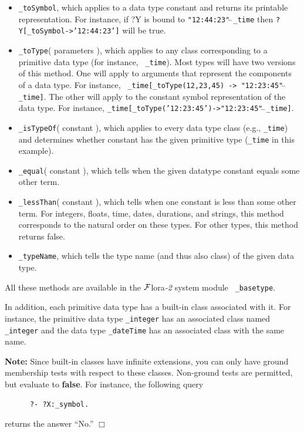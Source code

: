 \documentclass[11pt]{article}
\newcommand{\FLORA}{{\mbox{\sc ${\cal F}${lora}\rm\emph{-2}}}\xspace}
\begin{document}
 \begin{itemize}
    \item {\tt \_toSymbol}, which applies to a data type constant and
      returns its printable representation. For instance, if ?Y is bound to
      {\tt "12:44:23"$\hat{~}\hat{~}$\_time} then {\tt ?Y[\_toSymbol->'12:44:23']} will
      be true.
    \item {\tt \_toType}( parameters ), which applies to any class
      corresponding to a primitive data type (for instance, {\tt
        \_time}). Most types will have two versions of this method. One
      will apply to arguments that represent the components of a data
      type. For instance, {\tt
        \_time[\_toType(12,23,45) -> "12:23:45"$\hat{~}\hat{~}$\_time]}.  The other will
      apply to the constant symbol representation of the data type. For instance,
      {\tt \_time[\_toType('12:23:45')->"12:23:45"$\hat{~}\hat{~}$\_time]}. 
    \item {\tt \_isTypeOf}( constant ), which applies to every data type
      class (e.g., {\tt \_time}) and determines whether constant has the
      given primitive type ({\tt \_time} in this example).
    \item {\tt \_equal}( constant ), which tells when the given datatype constant equals some other term.
    \item {\tt \_lessThan}( constant ), which tells when one constant is
      less than some other term. For integers, floats, time, dates,
      durations, and strings, this method corresponds to the natural order
      on these types. For other types, this method returns false.
    \item {\tt \_typeName}, which tells the type name (and thus also class)
      of the given data type.
    \end{itemize}

    All these methods are available in the \FLORA system module {\tt
      \_basetype}. 

In addition, each primitive data type has a built-in class associated with it.
For instance, the primitive data type {\tt \_integer} has an associated
class  named {\tt \_integer} and the data type {\tt \_dateTime} has an
associated class with the same name.  

\noindent
{\bf Note:} Since built-in classes have infinite extensions, you can only have
ground membership tests with respect to these classes. Non-ground tests are
permitted, but evaluate to {\bf false}. For instance, the following
query
\begin{verbatim}
      ?- ?X:_symbol.
\end{verbatim}
returns the answer ``No.''
\hfill$\Box$
\end{document}
